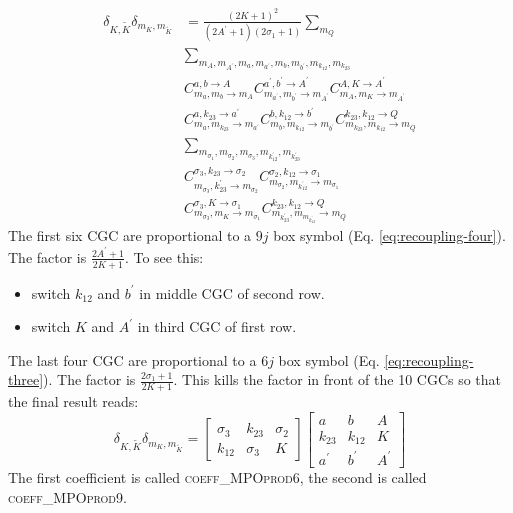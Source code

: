 \documentclass[a4paper,10pt,parskip=full]{scrartcl}
\begin{document}
\begin{equation}
  \begin{split}
  \delta_{K,\tilde{K}}\delta_{m_K,m_{\tilde{K}}}&=
  \frac{(2K+1)^2}{(2A^\prime+1)(2\sigma_1+1)}\sum_{m_Q}\\
  &\sum_{m_{A},m_{A^\prime},m_{a},m_{a^\prime},m_{b},m_{b^\prime},m_{k_{12}},m_{k_{23}}}\\
  &C^{a,b\rightarrow
    A}_{{m_a,m_{b}}\rightarrow m_{A}}C^{a^\prime,b^\prime\rightarrow
    A^\prime}_{m_{a^\prime},m_{b^\prime}\rightarrow
    m_{A^\prime}}C^{A,K\rightarrow
    A^\prime}_{m_A,m_{K}\rightarrow
    m_{A^\prime}}\\
  &C^{a,k_{23}\rightarrow a^\prime}_{m_a,m_{k_{23}}\rightarrow m_{a^\prime}}C^{b,k_{12}\rightarrow
    b^\prime}_{m_b,m_{k_{12}}\rightarrow m_{b^\prime}}C^{k_{23},k_{12}\rightarrow
    Q}_{m_{k_{23}},m_{k_{12}}\rightarrow m_{Q}}\\
   &\sum_{m_{\sigma_1},m_{\sigma_2},m_{\sigma_3},m_{k_{12}^\prime},m_{k_{23}^\prime}}\\
   &C^{\sigma_3,k_{23}\rightarrow \sigma_2}_{m_{\sigma_3},k_{23}^\prime\rightarrow m_{\sigma_2}}C^{\sigma_2,k_{12}\rightarrow
    \sigma_1}_{m_{\sigma_2},m_{k_{12}^\prime}\rightarrow m_{\sigma_1}}\\
   &C^{\sigma_3,K\rightarrow\sigma_1}_{m_{\sigma_3},m_{K}\rightarrow
    m_{\sigma_1}}C^{k_{23},k_{12}\rightarrow Q}_{m_{k_{23}^\prime},m_{m_{k_{12}^\prime}}\rightarrow m_{Q}}
  \end{split}
\end{equation}
The first six CGC are proportional to a $9j$ box symbol (Eq. \ref{eq:recoupling-four}). The factor is
$\frac{2A^\prime+1}{2K+1}$.
To see this:
\begin{itemize}
\item switch $k_{12}$ and $b^\prime$ in middle CGC of second row.
\item switch $K$ and $A^\prime$ in third CGC of first row.
\end{itemize}
The last four CGC are proportional to a $6j$ box symbol
(Eq. \ref{eq:recoupling-three}). The factor is
$\frac{2\sigma_1+1}{2K+1}$. This kills the factor in front of the 10
CGCs so that the final result reads:
\begin{equation}
    \delta_{K,\tilde{K}}\delta_{m_K,m_{\tilde{K}}}=
    \begin{bmatrix}
    \sigma_3 & k_{23} & \sigma_2 \\
    k_{12} & \sigma_3 & K
  \end{bmatrix}
  \begin{bmatrix}
    a & b & A \\
    k_{23} & k_{12} & K \\
    a^\prime & b^\prime &A^\prime
  \end{bmatrix}
\end{equation}
The first coefficient is called \textsc{coeff\_MPOprod6}, the second
is called \textsc{coeff\_MPOprod9}.
\end{document}
